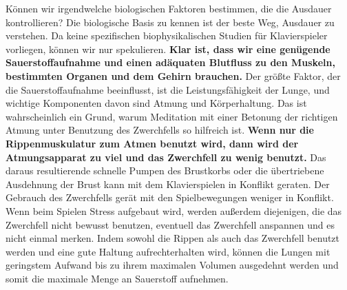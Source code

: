 Können wir irgendwelche biologischen Faktoren bestimmen, die die Ausdauer kontrollieren?
Die biologische Basis zu kennen ist der beste Weg, Ausdauer zu verstehen.
Da keine spezifischen biophysikalischen Studien für Klavierspieler vorliegen, können wir nur spekulieren.
\textbf{Klar ist, dass wir eine genügende Sauerstoffaufnahme und einen adäquaten Blutfluss zu den Muskeln, bestimmten Organen und dem Gehirn brauchen.}
Der größte Faktor, der die Sauerstoffaufnahme beeinflusst, ist die Leistungsfähigkeit der Lunge, und wichtige Komponenten davon sind Atmung und Körperhaltung.
Das ist wahrscheinlich ein Grund, warum Meditation mit einer Betonung der richtigen Atmung unter Benutzung des Zwerchfells so hilfreich ist.
\textbf{Wenn nur die Rippenmuskulatur zum Atmen benutzt wird, dann wird der Atmungsapparat zu viel und das Zwerchfell zu wenig benutzt.}
Das daraus resultierende schnelle Pumpen des Brustkorbs oder die übertriebene Ausdehnung der Brust kann mit dem Klavierspielen in Konflikt geraten.
Der Gebrauch des Zwerchfells gerät mit den Spielbewegungen weniger in Konflikt.
Wenn beim Spielen Stress aufgebaut wird, werden außerdem diejenigen, die das Zwerchfell nicht bewusst benutzen, eventuell das Zwerchfell anspannen und es nicht einmal merken.
Indem sowohl die Rippen als auch das Zwerchfell benutzt werden und eine gute Haltung aufrechterhalten wird, können die Lungen mit geringstem Aufwand bis zu ihrem maximalen Volumen ausgedehnt werden und somit die maximale Menge an Sauerstoff aufnehmen.


